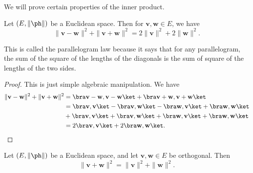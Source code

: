 \documentclass[a4paper]{article}
\begin{document}
We will prove certain properties of the inner product.
\begin{prop}
  Let $(E, \|\ph\|)$ be a Euclidean space. Then for $\mathbf{v}, \mathbf{w} \in E$, we have
  \[
    \|\mathbf{v} - \mathbf{w}\|^2 + \|\mathbf{v} + \mathbf{w}\|^2 = 2\|\mathbf{v}\|^2 + 2\|\mathbf{w}\|^2.
  \]
\end{prop}
This is called the parallelogram law because it says that for any parallelogram, the sum of the square of the lengths of the diagonals is the sum of square of the lengths of the two sides.
\begin{center}
\end{center}

\begin{proof}
  This is just simple algebraic manipulation. We have
  \begin{align*}
    \|\mathbf{v} - \mathbf{w}\|^2 + \|\mathbf{v} + \mathbf{w}\|^2 &= \bra \mathbf{v} - \mathbf{w}, \mathbf{v} - \mathbf{w}\ket + \bra \mathbf{v} + \mathbf{w}, \mathbf{v} + \mathbf{w}\ket\\
    &= \bra \mathbf{v}, \mathbf{v}\ket - \bra \mathbf{v}, \mathbf{w}\ket - \bra \mathbf{w}, \mathbf{v}\ket + \bra \mathbf{w}, \mathbf{w}\ket\\
    &+ \bra \mathbf{v}, \mathbf{v}\ket + \bra \mathbf{v}, \mathbf{w}\ket + \bra \mathbf{w}, \mathbf{v}\ket + \bra \mathbf{w}, \mathbf{w}\ket\\
    &= 2\bra \mathbf{v}, \mathbf{v}\ket + 2 \bra \mathbf{w}, \mathbf{w}\ket.\qedhere
  \end{align*}
\end{proof}

\begin{prop}
  Let $(E, \|\ph\|)$ be a Euclidean space, and let $\mathbf{v}, \mathbf{w}\in E$ be orthogonal. Then
  \[
    \|\mathbf{v} + \mathbf{w}\|^2 = \|\mathbf{v}\|^2 + \|\mathbf{w}\|^2.
  \]
\end{prop}
\end{document}
